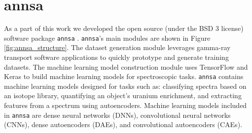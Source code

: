 









\section{annsa}

As a part of this work we developed the open source (under the BSD 3 license) software package \verb|annsa| \cite{annsa}. \verb|annsa|'s main modules are shown in Figure \ref{fig:annsa_structure}. The dataset generation module leverages gamma-ray transport software applications to quickly prototype and generate training datasets. The machine learning model construction module uses TensorFlow \cite{tensorflow2015-whitepaper} and Keras \cite{chollet2015keras} to build machine learning models for spectroscopic tasks. \verb|annsa| contains machine learning models designed for tasks such as: classifying spectra based on an isotope library, quantifying an object's uranium enrichment, and extracting features from a spectrum using autoencoders. Machine learning models included in \verb|annsa| are dense neural networks (DNNs), convolutional neural networks (CNNs), dense autoencoders (DAEs), and convolutional autoencoders (CAEs).

